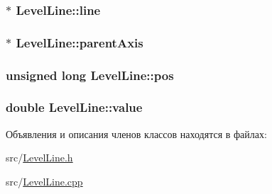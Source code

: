 \hypertarget{class_level_line_a98488406c76533a2e70d83197df2614b}{
\subsubsection[{line}]{$\ast$ Level\-Line\-::line\hspace{0.3cm}{\ttfamily [protected]}}}\label{class_level_line_a98488406c76533a2e70d83197df2614b}
\hypertarget{class_level_line_abcbf6e0a95632519d52b3c0828c926f4}{
\subsubsection[{parent\-Axis}]{$\ast$ Level\-Line\-::parent\-Axis\hspace{0.3cm}{\ttfamily [protected]}}}\label{class_level_line_abcbf6e0a95632519d52b3c0828c926f4}
\hypertarget{class_level_line_ae4d3c142f618f987e6d7fc35e98e71d0}{
\subsubsection[{pos}]{\setlength{\rightskip}{0pt plus 5cm}unsigned long Level\-Line\-::pos\hspace{0.3cm}{\ttfamily [protected]}}}\label{class_level_line_ae4d3c142f618f987e6d7fc35e98e71d0}
\hypertarget{class_level_line_ad006f9359dd288a3b189ab964bca9484}{
\subsubsection[{value}]{\setlength{\rightskip}{0pt plus 5cm}double Level\-Line\-::value\hspace{0.3cm}{\ttfamily [protected]}}}\label{class_level_line_ad006f9359dd288a3b189ab964bca9484}


Объявления и описания членов классов находятся в файлах\-:\begin{DoxyCompactItemize}
\item 
src/\hyperlink{_level_line_8h}{Level\-Line.\-h}\item 
src/\hyperlink{_level_line_8cpp}{Level\-Line.\-cpp}\end{DoxyCompactItemize}
